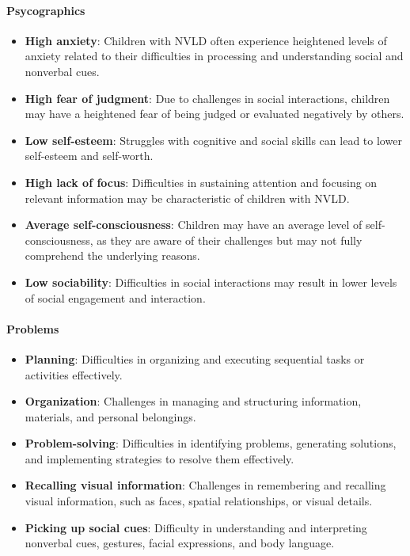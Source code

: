 \paragraph{Psycographics}
\begin{itemize}
    \item \textbf{High anxiety}: Children with NVLD often experience heightened levels of anxiety related to their difficulties in processing and understanding social and nonverbal cues.
    \item \textbf{High fear of judgment}: Due to challenges in social interactions, children may have a heightened fear of being judged or evaluated negatively by others.
    \item \textbf{Low self-esteem}: Struggles with cognitive and social skills can lead to lower self-esteem and self-worth.
    \item \textbf{High lack of focus}: Difficulties in sustaining attention and focusing on relevant information may be characteristic of children with NVLD.
    \item \textbf{Average self-consciousness}: Children may have an average level of self-consciousness, as they are aware of their challenges but may not fully comprehend the underlying reasons.
    \item \textbf{Low sociability}: Difficulties in social interactions may result in lower levels of social engagement and interaction.
\end{itemize}

\paragraph{Problems}
\begin{itemize}
    \item \textbf{Planning}: Difficulties in organizing and executing sequential tasks or activities effectively.
    \item \textbf{Organization}: Challenges in managing and structuring information, materials, and personal belongings.
    \item \textbf{Problem-solving}: Difficulties in identifying problems, generating solutions, and implementing strategies to resolve them effectively.
    \item \textbf{Recalling visual information}: Challenges in remembering and recalling visual information, such as faces, spatial relationships, or visual details.
    \item \textbf{Picking up social cues}: Difficulty in understanding and interpreting nonverbal cues, gestures, facial expressions, and body language.
\end{itemize}

